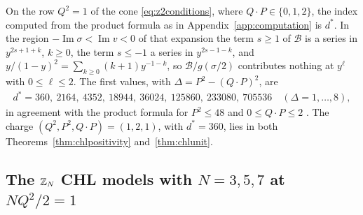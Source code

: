 On the row $Q^2=1$ of the cone \eqref{eq:z2conditions}, where $Q\cdot P\in\{0,1,2\}$, the index computed from the product formula as in Appendix~\ref{app:computation} is $d^*$. In the region $-\operatorname{Im}\sigma<\operatorname{Im}v<0$ of that expansion the term $s\ge1$ of $\mathcal B$ is a series in $y^{2s+1+k}$, $k\ge0$, the term $s\le-1$ a series in $y^{2s-1-k}$, and $y/(1-y)^2=\sum_{k\ge0}(k+1)y^{-1-k}$, so $\mathcal B/g(\sigma/2)$ contributes nothing at $y^\ell$ with $0\le\ell\le2$. The first values, with $\Delta=P^2-(Q\cdot P)^2$, are
\[
\begin{gathered}
d^*=360,\ 2164,\ 4352,\ 18944,\ 36024,\ 125860,\ 233080,\ 705536\quad(\Delta=1,\dots,8),
\end{gathered}
\]
in agreement with the product formula for $P^2\le48$ and $0\le Q\cdot P\le2$ \cite{Bha26}. The charge $(Q^2,P^2,Q\cdot P)=(1,2,1)$, with $d^*=360$, lies in both Theorems~\ref{thm:chlpositivity} and~\ref{thm:chlunit}.

\subsection{The \texorpdfstring{$\mathbb{Z}_N$}{ZN} CHL models with \texorpdfstring{$N=3,5,7$}{N=3,5,7} at \texorpdfstring{$NQ^2/2=1$}{NQ2/2=1}}\label{ssec:chlunitodd}

